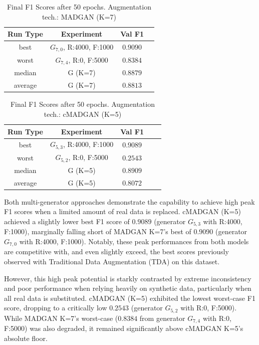 \begin{table}[H]
	\vspace{-1.5em}
	\centering
	\begin{tabular}{|c|c|c|c|}
		\hline
		Run Type & Experiment & Val F1 \\ \hline
		best & \(G_{7, 0}\), R:4000, F:1000 & $0.9090$\\ \hline
		worst & \(G_{7, 4}\), R:0, F:5000 & $0.8384$\\ \hline
		median & G (K=7) & $0.8879$\\ \hline
		average & G (K=7) & $0.8813$
		\\ \hline
	\end{tabular}
    \caption{Final F1 Scores after 50 epochs. Augmentation tech.: MADGAN (K=7)}
        \label{tab:res_replacement_fashion_cmadgan_vs_madgan__madgan}
\end{table}
\begin{table}[H]
	\centering
	\vspace{-1.5em}
	\begin{tabular}{|c|c|c|c|c|}
		\hline
		Run Type & Experiment & Val F1 \\ \hline
		best & \(G_{5, 3}\), R:4000, F:1000 & $0.9089$\\ \hline
		worst & \(G_{5, 2}\), R:0, F:5000 & $0.2543$\\ \hline
		median & G (K=5) & $0.8909$\\ \hline
		average & G (K=5) & $0.8072$
		\\ \hline
	\end{tabular}
    \caption{Final F1 Scores after 50 epochs. Augmentation tech.: cMADGAN (K=5)}
        \label{tab:res_replacement_fashion_cmadgan_vs_madgan__cmadgan}
\end{table}

Both multi-generator approaches demonstrate the capability to achieve high peak F1 scores when a limited amount of real data is replaced. cMADGAN (K=5) achieved a slightly lower best F1 score of $0.9089$ (generator \(G_{5,3}\) with R:4000, F:1000), marginally falling short of MADGAN K=7's best of $0.9090$ (generator \(G_{7,0}\) with R:4000, F:1000). Notably, these peak performances from both models are competitive with, and even slightly exceed, the best scores previously observed with Traditional Data Augmentation (TDA) on this dataset.

However, this high peak potential is starkly contrasted by extreme inconsistency and poor performance when relying heavily on synthetic data, particularly when all real data is substituted. cMADGAN (K=5) exhibited the lowest worst-case F1 score, dropping to a critically low $0.2543$ (generator \(G_{5,2}\) with R:0, F:5000). While MADGAN K=7's worst-case ($0.8384$ from generator \(G_{7,4}\) with R:0, F:5000) was also degraded, it remained significantly above cMADGAN K=5's absolute floor.

